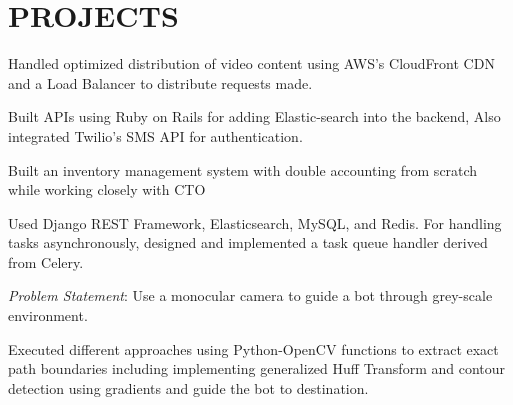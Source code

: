 \documentclass[]{deedy-resume-openfont}
\begin{document}
\begin{minipage}[t]{0.66\textwidth} 



\section{PROJECTS}

\vspace{\topsep} %
\begin{tightemize}
\item Handled optimized distribution of video content using AWS's CloudFront CDN and a Load Balancer to distribute requests made.
\item Built APIs using Ruby on Rails for adding Elastic-search into the backend, Also integrated Twilio's SMS API for authentication.
\end{tightemize}
\sectionsep

\begin{tightemize}
\item Built an inventory management system with double accounting from scratch while working closely with CTO 
\item Used Django REST Framework, Elasticsearch, MySQL, and Redis. For handling tasks asynchronously, designed and implemented a task queue handler derived from Celery.
\end{tightemize}
\sectionsep

\begin{tightemize}
\item {\emph{Problem Statement}:} Use a monocular camera to guide a bot through grey-scale environment.   
\item Executed different approaches using Python-OpenCV functions to extract exact path boundaries including implementing generalized Huff Transform and contour detection using gradients and guide the bot to destination. 
\end{tightemize}
\sectionsep


\end{minipage}
\end{document}
